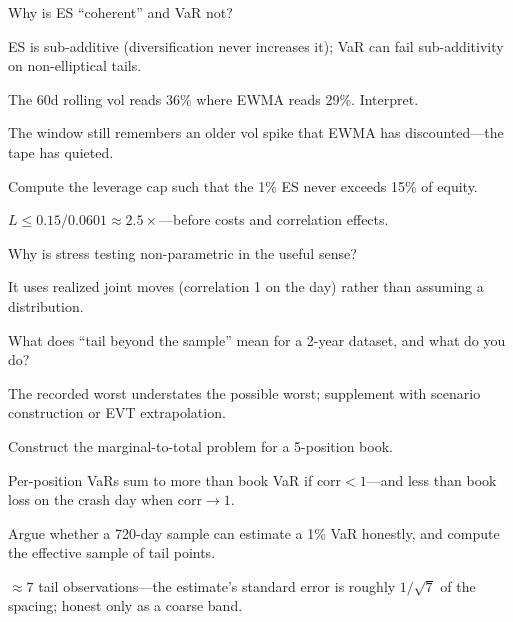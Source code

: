 \begin{exercise}
Why is ES ``coherent'' and VaR not?
\end{exercise}
\begin{solution}
ES is sub-additive (diversification never increases it); VaR can fail sub-additivity on
non-elliptical tails.
\end{solution}

\begin{exercise}
The 60d rolling vol reads 36\% where EWMA reads 29\%. Interpret.
\end{exercise}
\begin{solution}
The window still remembers an older vol spike that EWMA has discounted---the tape has
quieted.
\end{solution}

\begin{exercise}
Compute the leverage cap such that the 1\% ES never exceeds 15\% of equity.
\end{exercise}
\begin{solution}
$L\le0.15/0.0601\approx2.5\times$---before costs and correlation effects.
\end{solution}

\begin{exercise}
Why is stress testing non-parametric in the useful sense?
\end{exercise}
\begin{solution}
It uses realized joint moves (correlation 1 on the day) rather than assuming a
distribution.
\end{solution}

\begin{exercise}
What does ``tail beyond the sample'' mean for a 2-year dataset, and what do you do?
\end{exercise}
\begin{solution}
The recorded worst understates the possible worst; supplement with scenario construction
or EVT extrapolation.
\end{solution}

\begin{exercise}
Construct the marginal-to-total problem for a 5-position book.
\end{exercise}
\begin{solution}
Per-position VaRs sum to more than book VaR if corr${<}1$---and less than book loss on
the crash day when corr${\to}1$.
\end{solution}

\begin{exercise}[hard]
Argue whether a 720-day sample can estimate a 1\% VaR honestly, and compute the effective
sample of tail points.
\end{exercise}
\begin{solution}
$\approx7$ tail observations---the estimate's standard error is roughly $1/\sqrt7$ of the
spacing; honest only as a coarse band.
\end{solution}

